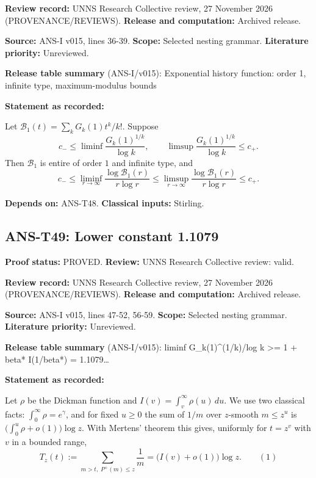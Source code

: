 \documentclass[
  11pt,
]{article}
\begin{document}
\textbf{Review record:} UNNS Research Collective review, 27 November
2026 (PROVENANCE/REVIEWS). \textbf{Release and computation:} Archived
release.

\textbf{Source:} ANS-I v015, lines 36-39. \textbf{Scope:} Selected
nesting grammar. \textbf{Literature priority:} Unreviewed.

\textbf{Release table summary} (ANS-I/v015): Exponential history
function: order 1, infinite type, maximum-modulus bounds

\textbf{Statement as recorded:}

Let \(\mathcal B_1(t)=\sum_kG_k(1)t^k/k!\). Suppose
\[c_-\le\liminf\frac{G_k(1)^{1/k}}{\log k},\qquad\limsup\frac{G_k(1)^{1/k}}{\log k}\le c_+ .\]
Then \(\mathcal B_1\) is entire of order \(1\) and infinite type, and
\[c_-\le\liminf_{r\to\infty}\frac{\log\mathcal B_1(r)}{r\log r}\le\limsup_{r\to\infty}\frac{\log\mathcal B_1(r)}{r\log r}\le c_+ .\]

\textbf{Depends on:} ANS-T48. \textbf{Classical inputs:} Stirling.

\hypertarget{ans-t49-lower-constant-1.1079}{%
\subsection{ANS-T49: Lower constant
1.1079}\label{ans-t49-lower-constant-1.1079}}

\textbf{Proof status:} PROVED. \textbf{Review:} UNNS Research Collective
review: valid.

\textbf{Review record:} UNNS Research Collective review, 27 November
2026 (PROVENANCE/REVIEWS). \textbf{Release and computation:} Archived
release.

\textbf{Source:} ANS-I v015, lines 47-52, 56-59. \textbf{Scope:}
Selected nesting grammar. \textbf{Literature priority:} Unreviewed.

\textbf{Release table summary} (ANS-I/v015): liminf G\_k(1)\^{}(1/k)/log
k \textgreater= 1 + beta* I(1/beta*) = 1.1079\ldots{}

\textbf{Statement as recorded:}

Let \(\rho\) be the Dickman function and
\(I(v)=\int_v^{\infty}\rho(u)\,du\). We use two classical facts:
\(\int_0^{\infty}\rho=e^{\gamma}\), and for fixed \(u\ge0\) the sum of
\(1/m\) over \(z\)-smooth \(m\le z^u\) is
\(\big(\int_0^u\rho+o(1)\big)\log z\). With Mertens' theorem this gives,
uniformly for \(t=z^v\) with \(v\) in a bounded range,
\[T_z(t):=\sum_{m>t,\;P^+(m)\le z}\frac1m=\big(I(v)+o(1)\big)\log z.\qquad(1)\]
\end{document}

